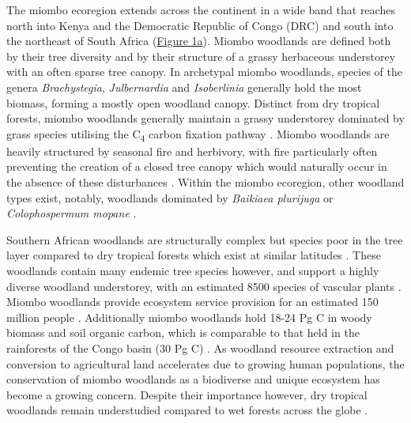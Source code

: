 \begin{refsection}
The miombo ecoregion extends across the continent in a wide band that reaches north into Kenya and the Democratic Republic of Congo (DRC) and south into the northeast of South Africa (\hyperref[plot_map]{Figure 1a}). Miombo woodlands are defined both by their tree diversity and by their structure of a grassy herbaceous understorey with an often sparse tree canopy. In archetypal miombo woodlands, species of the genera \textit{Brachystegia}, \textit{Julbernardia} and \textit{Isoberlinia} generally hold the most biomass, forming a mostly open woodland canopy. Distinct from dry tropical forests, miombo woodlands generally maintain a grassy understorey dominated by grass species utilising the C\textsubscript{4} carbon fixation pathway \citep{Dexter2015}. Miombo woodlands are heavily structured by seasonal fire and herbivory, with fire particularly often preventing the creation of a closed tree canopy which would naturally occur in the absence of these disturbances \citep{Oliveras2016, Dantas2016}. Within the miombo ecoregion, other woodland types exist, notably, woodlands dominated by \textit{Baikiaea plurijuga} or \textit{Colophospermum mopane} \citep{Campbell2002}.

Southern African woodlands are structurally complex but species poor in the tree layer compared to dry tropical forests which exist at similar latitudes \citep{DRYFLOR2016, Torello-raventos2013}. These woodlands contain many endemic tree species however, and support a highly diverse woodland understorey, with an estimated 8500 species of vascular plants \citep{Frost1996}. Miombo woodlands provide ecosystem service provision for an estimated 150 million people \citep{Ryan2016}. Additionally miombo woodlands hold \textapprox{}18-24 Pg C in woody biomass and soil organic carbon, which is comparable to that held in the rainforests of the Congo basin (\textapprox{}30 Pg C) \citep{Mayaux2008}. As woodland resource extraction and conversion to agricultural land accelerates due to growing human populations, the conservation of miombo woodlands as a biodiverse and unique ecosystem has become a growing concern. Despite their importance however, dry tropical woodlands remain understudied compared to wet forests across the globe \citep{Clarke2017}. 


\end{refsection}
